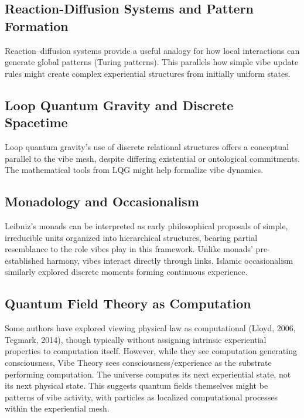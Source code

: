 \subsection{Reaction-Diffusion Systems and Pattern Formation}

Reaction–diffusion systems provide a useful analogy for how local interactions can generate global patterns (Turing patterns). This parallels how simple vibe update rules might create complex experiential structures from initially uniform states.

\subsection{Loop Quantum Gravity and Discrete Spacetime}

Loop quantum gravity's use of discrete relational structures offers a conceptual parallel to the vibe mesh, despite differing existential or ontological commitments. The mathematical tools from LQG might help formalize vibe dynamics.

\subsection{Monadology and Occasionalism}

Leibniz's monads can be interpreted as early philosophical proposals of simple, irreducible units organized into hierarchical structures, bearing partial resemblance to the role vibes play in this framework. Unlike monads' pre-established harmony, vibes interact directly through links. Islamic occasionalism similarly explored discrete moments forming continuous experience.

\subsection{Quantum Field Theory as Computation}

Some authors have explored viewing physical law as computational (Lloyd, 2006, Tegmark, 2014), though typically without assigning intrinsic experiential properties to computation itself. However, while they see computation generating consciousness, Vibe Theory sees consciousness/experience as the substrate performing computation. The universe computes its next experiential state, not its next physical state. This suggests quantum fields themselves might be patterns of vibe activity, with particles as localized computational processes within the experiential mesh.

